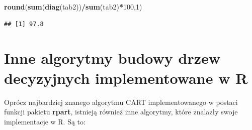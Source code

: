 \documentclass[]{book}
\newenvironment{Shaded}{\begin{snugshade}}{\end{snugshade}}
\newcommand{\DecValTok}[1]{\textcolor[rgb]{0.00,0.00,0.81}{#1}}
\newcommand{\KeywordTok}[1]{\textcolor[rgb]{0.13,0.29,0.53}{\textbf{#1}}}
\newcommand{\NormalTok}[1]{#1}
\newcommand{\OperatorTok}[1]{\textcolor[rgb]{0.81,0.36,0.00}{\textbf{#1}}}
\theoremstyle{plain}
\theoremstyle{definition}
\theoremstyle{definition}
\theoremstyle{definition}
\theoremstyle{definition}
\theoremstyle{remark}
\begin{document}
\begin{Shaded}
\begin{Highlighting}[]
\KeywordTok{round}\NormalTok{(}\KeywordTok{sum}\NormalTok{(}\KeywordTok{diag}\NormalTok{(tab2))}\OperatorTok{/}\KeywordTok{sum}\NormalTok{(tab2)}\OperatorTok{*}\DecValTok{100}\NormalTok{,}\DecValTok{1}\NormalTok{)}
\end{Highlighting}
\end{Shaded}

\begin{verbatim}
## [1] 97.8
\end{verbatim}

\hypertarget{inne-algorytmy-budowy-drzew-decyzyjnych-implementowane-w-r}{%
\section{\texorpdfstring{Inne algorytmy budowy drzew decyzyjnych implementowane w \textbf{R}}{Inne algorytmy budowy drzew decyzyjnych implementowane w R}}\label{inne-algorytmy-budowy-drzew-decyzyjnych-implementowane-w-r}}

Oprócz najbardziej znanego algorytmu CART implementowanego w postaci funkcji pakietu \textbf{rpart}, istnieją również inne algorytmy, które znalazły swoje implementacje w R. Są to:
\end{document}
